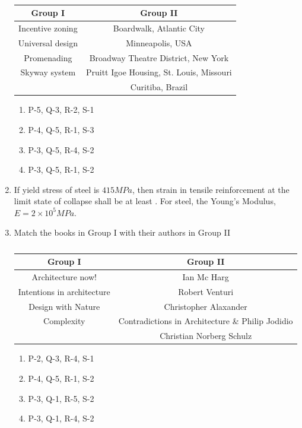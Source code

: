 \documentclass[journal,12pt,onecolumn]{IEEEtran}
\theoremstyle{remark}
\begin{document}
\begin{enumerate}
\begin{table}[H]
\centering
\begin{tabular}{c|c}
Group I & Group II \\
\hline
Incentive zoning & Boardwalk, Atlantic City \\
Universal design & Minneapolis, USA \\
Promenading & Broadway Theatre District, New York \\
Skyway system & Pruitt Igoe Housing, St. Louis, Missouri \\
 & Curitiba, Brazil \\
\end{tabular}
\caption*{}
\label{Q.47}
\end{table}

\hfill{}
\begin{enumerate}
\item P-5, Q-3, R-2, S-1
\item P-4, Q-5, R-1, S-3
\item P-3, Q-5, R-4, S-2
\item P-3, Q-5, R-1, S-2
\end{enumerate}

\item If yield stress of steel is $415 MPa$, then strain in tensile reinforcement at the limit state of collapse shall be at least \underline{\hspace{2.5cm}}. For steel, the Young's Modulus, $E = 2 \times 10^5 MPa$.

\hfill{}

\item Match the books in Group I with their authors in Group II

\begin{table}[H]
\centering
\begin{tabular}{c|c}
Group I & Group II \\
\hline
Architecture now! & Ian Mc Harg \\
Intentions in architecture & Robert Venturi \\
Design with Nature & Christopher Alaxander \\
Complexity & Contradictions in Architecture \& Philip Jodidio \\
 & Christian Norberg Schulz \\
\end{tabular}
\caption*{}
\label{tab:Q.49}
\end{table}

\hfill{}
\begin{enumerate}
\item P-2, Q-3, R-4, S-1
\item P-4, Q-5, R-1, S-2
\item P-3, Q-1, R-5, S-2
\item P-3, Q-1, R-4, S-2
\end{enumerate}


\end{enumerate}
\end{document}
